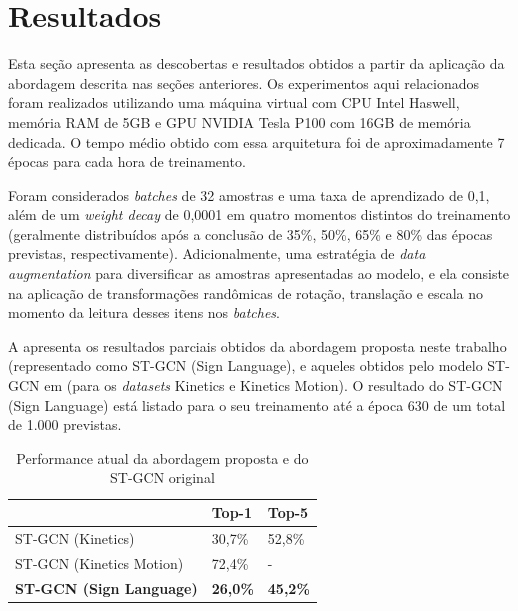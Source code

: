 \section{Resultados} %
\label{sec:resultados}

Esta seção apresenta as descobertas e resultados obtidos a partir da aplicação da abordagem descrita nas seções anteriores. Os experimentos aqui relacionados foram realizados utilizando uma máquina virtual com CPU Intel Haswell, memória RAM de 5GB e GPU NVIDIA Tesla P100 com 16GB de memória dedicada. O tempo médio obtido com essa arquitetura foi de aproximadamente 7 épocas para cada hora de treinamento.

Foram considerados \textit{batches} de 32 amostras e uma taxa de aprendizado de 0,1, além de um \textit{weight decay} de 0,0001 em quatro momentos distintos do treinamento (geralmente distribuídos após a conclusão de 35\%, 50\%, 65\% e 80\% das épocas previstas, respectivamente). 
Adicionalmente, uma estratégia de \textit{data augmentation} para diversificar as amostras apresentadas ao modelo, e ela consiste na aplicação de transformações randômicas de rotação, translação e escala no momento da leitura desses itens nos \textit{batches}.

A  apresenta os resultados parciais obtidos da abordagem proposta neste trabalho (representado como ST-GCN (Sign Language), e aqueles obtidos pelo modelo ST-GCN em \cite{st-gcn-2018} (para os \textit{datasets} Kinetics e Kinetics Motion). O resultado do ST-GCN (Sign Language) está listado para o seu treinamento até a época 630 de um total de 1.000 previstas.

\begin{table}[ht]
    \centering
    \caption{Performance atual da abordagem proposta e do ST-GCN original}
    \label{tab:resultados-1}
    \begin{tabular}{@{}lll@{}} \toprule
                                        &   Top-1           &   Top-5           \\ \midrule
        ST-GCN (Kinetics)               &   30,7\%          &   52,8\%          \\
        ST-GCN (Kinetics Motion)        &   72,4\%          &   -               \\ \midrule
        \textbf{ST-GCN (Sign Language)} & \textbf{26,0\%}   &   \textbf{45,2\%} \\ \bottomrule
    \end{tabular}
\end{table}


